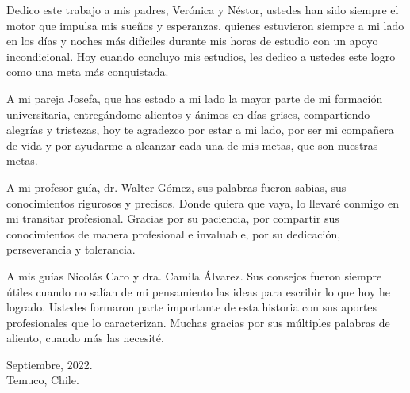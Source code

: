 


Dedico este trabajo a mis padres, Verónica y Néstor, ustedes han sido siempre el motor que impulsa mis sueños y esperanzas, 
quienes estuvieron siempre a mi lado en los días y noches más difíciles durante mis horas de estudio con un apoyo incondicional. 
Hoy cuando concluyo mis estudios, les dedico a ustedes este logro como una meta más conquistada. 

A mi pareja Josefa, que has estado a mi lado la mayor parte de mi formación universitaria, entregándome alientos y ánimos en días grises, compartiendo alegrías y tristezas,
hoy te agradezco por estar a mi lado, por ser mi compañera de vida y por ayudarme a alcanzar cada una de mis metas, que son nuestras metas.

A mi profesor guía, dr. Walter Gómez, sus palabras fueron sabias, sus conocimientos rigurosos y precisos. Donde quiera que vaya, 
lo llevaré conmigo en mi transitar profesional. Gracias por su paciencia, por compartir sus conocimientos de manera profesional e invaluable, por su dedicación, perseverancia y tolerancia.

A mis guías Nicolás Caro y dra. Camila Álvarez. Sus consejos fueron siempre 
útiles cuando no salían de mi pensamiento las ideas para escribir lo que hoy he logrado. Ustedes formaron parte importante de esta historia con sus aportes profesionales que 
lo caracterizan. Muchas gracias por sus múltiples palabras de aliento, cuando más las necesité. 

\vfill
\singlespacing
\begin{flushright}
	\noindent
    Septiembre, 2022. \\
	Temuco, Chile. 
\end{flushright}
    
